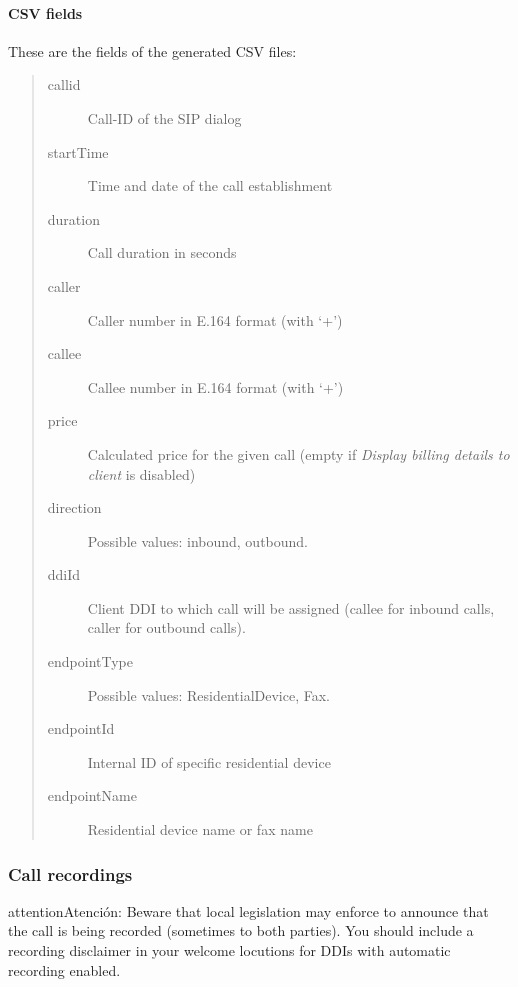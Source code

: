 \documentclass[letterpaper,10pt,spanish]{sphinxmanual}
\begin{document}
\paragraph{CSV fields}
\label{administration_portal/client/residential/calls/call_csv_schedulers:csv-fields}
These are the fields of the generated CSV files:
\begin{quote}
\begin{description}
\item[{callid}] \leavevmode
Call-ID of the SIP dialog

\item[{startTime}] \leavevmode
Time and date of the call establishment

\item[{duration}] \leavevmode
Call duration in seconds

\item[{caller}] \leavevmode
Caller number in E.164 format (with `+')

\item[{callee}] \leavevmode
Callee number in E.164 format (with `+')

\item[{price}] \leavevmode
Calculated price for the given call (empty if \emph{Display billing details to client} is disabled)

\item[{direction}] \leavevmode
Possible values: inbound, outbound.

\item[{ddiId}] \leavevmode
Client DDI to which call will be assigned (callee for inbound calls, caller for outbound calls).

\item[{endpointType}] \leavevmode
Possible values: ResidentialDevice, Fax.

\item[{endpointId}] \leavevmode
Internal ID of specific residential device

\item[{endpointName}] \leavevmode
Residential device name or fax name

\end{description}
\end{quote}


\subsubsection{Call recordings}
\label{administration_portal/client/residential/calls/call_recordings::doc}\label{administration_portal/client/residential/calls/call_recordings:call-recordings}
\begin{notice}{attention}{Atención:}
Beware that local legislation may enforce to announce that the
call is being recorded (sometimes to both parties). You should include
a recording disclaimer in your welcome locutions for DDIs with automatic
recording enabled.
\end{notice}
\end{document}
